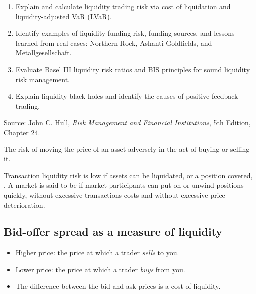 
\begin{lrkeybox}
\begin{enumerate}[label=\textbf{\alph*.}]
\item Explain and calculate liquidity trading risk via cost of liquidation and liquidity-adjusted VaR (LVaR).
\item Identify examples of liquidity funding risk, funding sources, and lessons learned from real cases: Northern Rock, Ashanti Goldfields, and Metallgesellschaft.
\item Evaluate Basel III liquidity risk ratios and BIS principles for sound liquidity risk management.
\item Explain liquidity black holes and identify the causes of positive feedback trading.
\end{enumerate}
{\footnotesize\color{FRMGrey}Source: John C. Hull, \textit{Risk Management and Financial Institutions}, 5th Edition, Chapter 24.}
\end{lrkeybox}


\begin{lrdefbox}
The risk of moving the price of an asset adversely in the act of buying or selling it.
\end{lrdefbox}

Transaction liquidity risk is low if assets can be liquidated, or a position covered, . A market is said to be  if market participants can put on or unwind positions quickly, without excessive transactions costs and without excessive price deterioration.

\subsection{Bid-offer spread as a measure of liquidity}

\begin{itemize}
\item Higher  price: the price at which a trader \emph{sells} to you.
\item Lower  price: the price at which a trader \emph{buys} from you.
\item The difference between the bid and ask prices is a cost of liquidity.
\end{itemize}


